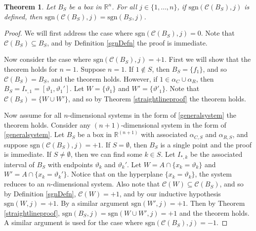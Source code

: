 \documentclass[12pt]{article}
\newtheorem{theorem}{Theorem}[section]
\theoremstyle{definition}
\theoremstyle{remark}
\newcommand\sgn{\text{sgn}}
\newcommand{\cC}{\mathcal{C}}
\newcommand{\bbR}{\mathbb{R}} %
\begin{document}
\begin{theorem} \label{cornerpointproof}
Let $B_S$ be a box in $\bbR^n$. For all $j\in\{1,\dots,n\}$, if $\sgn(\cC(B_S),j)$ is defined, then $\sgn(\cC(B_S),j)=\sgn(B_S,j)$.
\end{theorem}

\begin{proof}
We will first address the case where $\sgn(\cC(B_S),j)=0$. Note that $\cC(B_S) \subseteq B_S$, and by Definition \ref{sgnDefn} the proof is immediate.

Now consider the case where $\sgn(\cC(B_S),j)=+1$. First we will show that the theorem holds for $n=1$. Suppose $n=1$. If $1\notin S$, then $B_S=\{f_1\}$, and so $\cC(B_S)=B_S$, and the theorem holds. However, if $1\in \alpha_C \cup \alpha_R$, then $B_S=I_{*,1}=[\vartheta_1,\vartheta_1']$. Let $W=\{\vartheta_1\}$ and $W'=\{\vartheta'_1\}$. Note that $\cC(B_S)=\{W \cup W'\}$, and so by Theorem \ref{straightlineproof} the theorem holds.
 
Now assume for all $n$-dimensional systems in the form of \eqref{generalsystem} the theorem holds. Consider any $(n+1)$-dimensional system in the form of \eqref{generalsystem}. Let $B_S$ be a box in $\bbR^{(n+1)}$ with associated $\alpha_{C,S}$ and $\alpha_{R,S}$, and suppose $\sgn(\cC(B_S),j)=+1$. If $S=\emptyset$, then $B_S$ is a single point and the proof is immediate. If $S \neq \emptyset$, then we can find some $k\in S$. Let $I_{*,k}$ be the associated interval of $B_S$ with endpoints $\vartheta_k$ and $\vartheta_k'$. Let $W=A \cap \{x_k=\vartheta_k\}$ and $W'=A \cap \{x_k=\vartheta_k'\}$. Notice that on the hyperplane $\{x_k=\vartheta_k\}$, the system reduces to an $n$-dimensional system. Also note that $\cC(W)\subseteq\cC(B_S)$, and so by Definition \ref{sgnDefn}, $\cC(W)=+1$, and by our inductive hypothesis $\sgn(W,j)=+1$. By a similar argument $\sgn(W',j)=+1$. Then by Theorem \ref{straightlineproof}, $\sgn(B_S,j)=\sgn(W\cup W',j)=+1$ and the theorem holds. A similar argument is used for the case where $\sgn(\cC(B_S),j)=-1$.
\end{proof} 
\end{document}
